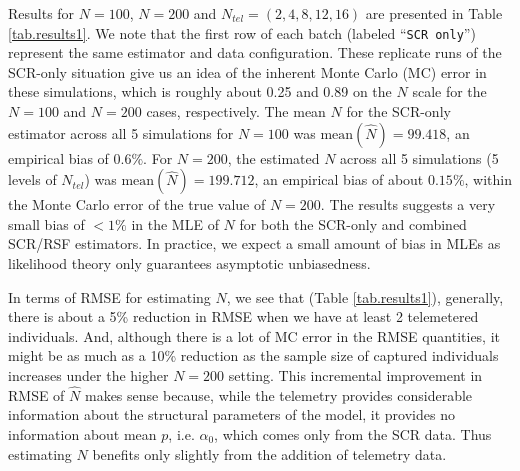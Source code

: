 \documentclass[12pt]{article}
\begin{document}
Results for $N=100$, $N=200$ and $N_{tel}=(2,4,8,12,16)$ are presented
in Table \ref{tab.results1}. We note that the first row of each batch
(labeled ``\mbox{\tt SCR only}'') represent the same estimator and data
configuration. These replicate runs of the SCR-only situation give us
an idea of the inherent Monte Carlo (MC) error in these simulations, which is
roughly about 0.25 and 0.89 on the $N$ scale for the $N=100$ and
$N=200$ cases, respectively.  The mean $N$ for the SCR-only
estimator across all 5 simulations for $N=100$ was
$\mbox{mean}(\hat{N}) = 99.418$, an empirical bias of $0.6\%$. For
$N=200$, the estimated $N$ across all 5 simulations (5 levels of
$N_{tel}$) was $\mbox{mean}(\hat{N}) = 199.712$, an empirical bias of
about $0.15\%$, within the Monte Carlo error of the true value of $N=200$.  The
results suggests a very small bias of $< 1\%$ in the MLE of $N$ for
both the  SCR-only and combined SCR/RSF estimators.  In practice, we
expect a small amount of bias in MLEs as likelihood theory only
guarantees asymptotic unbiasedness.


In terms of RMSE for estimating $N$, we see that (Table
\ref{tab.results1}), generally, there is about a 5\% reduction in RMSE
when we have at least 2 telemetered individuals. And, although there
is a lot of MC error in the RMSE quantities, it might be as much as a
10\% reduction as the sample size of captured individuals increases
under the higher $N=200$ setting. This incremental improvement in RMSE
of $\hat{N}$
makes sense because, while the
telemetry provides considerable information about the structural
parameters of the model, it provides no information about mean $p$,
i.e. $\alpha_{0}$, which comes only from the SCR data. Thus estimating
$N$ benefits only slightly from the addition of telemetry data.
\end{document}
